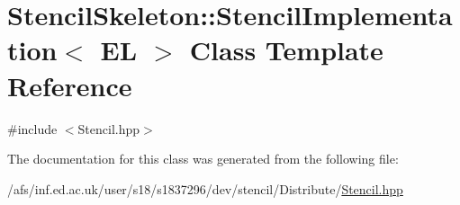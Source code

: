 \hypertarget{classStencilSkeleton_1_1StencilImplementation}{\section{Stencil\-Skeleton\-:\-:Stencil\-Implementation$<$ E\-L $>$ Class Template Reference}
\label{classStencilSkeleton_1_1StencilImplementation}
}


{\ttfamily \#include $<$Stencil.\-hpp$>$}



The documentation for this class was generated from the following file\-:\begin{DoxyCompactItemize}
\item 
/afs/inf.\-ed.\-ac.\-uk/user/s18/s1837296/dev/stencil/\-Distribute/\hyperlink{Stencil_8hpp}{Stencil.\-hpp}\end{DoxyCompactItemize}
